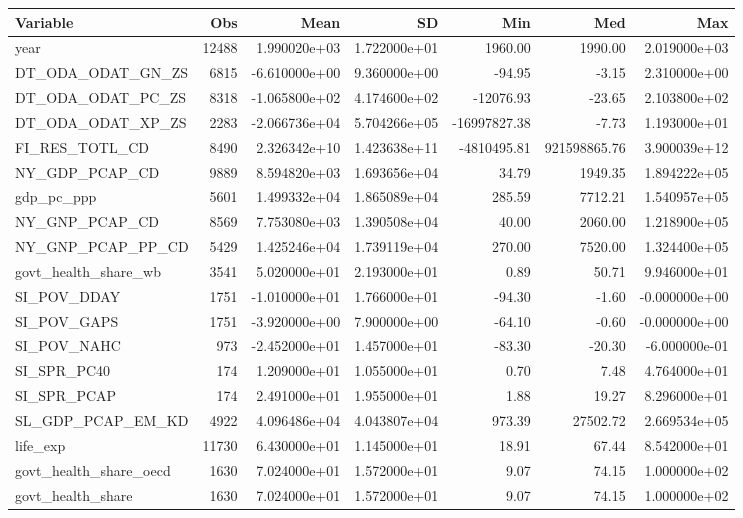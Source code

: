 \begin{tabular}{lrrrrrr}
\toprule
              Variable &   Obs &          Mean &           SD &          Min &          Med &           Max \\
\midrule
year & 12488 & 1.990020e+03 & 1.722000e+01 & 1960.00 & 1990.00 & 2.019000e+03 \\
DT\_ODA\_ODAT\_GN\_ZS & 6815 & -6.610000e+00 & 9.360000e+00 & -94.95 & -3.15 & 2.310000e+00 \\
DT\_ODA\_ODAT\_PC\_ZS & 8318 & -1.065800e+02 & 4.174600e+02 & -12076.93 & -23.65 & 2.103800e+02 \\
DT\_ODA\_ODAT\_XP\_ZS & 2283 & -2.066736e+04 & 5.704266e+05 & -16997827.38 & -7.73 & 1.193000e+01 \\
FI\_RES\_TOTL\_CD & 8490 & 2.326342e+10 & 1.423638e+11 & -4810495.81 & 921598865.76 & 3.900039e+12 \\
NY\_GDP\_PCAP\_CD & 9889 & 8.594820e+03 & 1.693656e+04 & 34.79 & 1949.35 & 1.894222e+05 \\
gdp\_pc\_ppp & 5601 & 1.499332e+04 & 1.865089e+04 & 285.59 & 7712.21 & 1.540957e+05 \\
NY\_GNP\_PCAP\_CD & 8569 & 7.753080e+03 & 1.390508e+04 & 40.00 & 2060.00 & 1.218900e+05 \\
NY\_GNP\_PCAP\_PP\_CD & 5429 & 1.425246e+04 & 1.739119e+04 & 270.00 & 7520.00 & 1.324400e+05 \\
govt\_health\_share\_wb & 3541 & 5.020000e+01 & 2.193000e+01 & 0.89 & 50.71 & 9.946000e+01 \\
SI\_POV\_DDAY & 1751 & -1.010000e+01 & 1.766000e+01 & -94.30 & -1.60 & -0.000000e+00 \\
SI\_POV\_GAPS & 1751 & -3.920000e+00 & 7.900000e+00 & -64.10 & -0.60 & -0.000000e+00 \\
SI\_POV\_NAHC & 973 & -2.452000e+01 & 1.457000e+01 & -83.30 & -20.30 & -6.000000e-01 \\
SI\_SPR\_PC40 & 174 & 1.209000e+01 & 1.055000e+01 & 0.70 & 7.48 & 4.764000e+01 \\
SI\_SPR\_PCAP & 174 & 2.491000e+01 & 1.955000e+01 & 1.88 & 19.27 & 8.296000e+01 \\
SL\_GDP\_PCAP\_EM\_KD & 4922 & 4.096486e+04 & 4.043807e+04 & 973.39 & 27502.72 & 2.669534e+05 \\
life\_exp & 11730 & 6.430000e+01 & 1.145000e+01 & 18.91 & 67.44 & 8.542000e+01 \\
govt\_health\_share\_oecd & 1630 & 7.024000e+01 & 1.572000e+01 & 9.07 & 74.15 & 1.000000e+02 \\
govt\_health\_share & 1630 & 7.024000e+01 & 1.572000e+01 & 9.07 & 74.15 & 1.000000e+02 \\
\bottomrule
\end{tabular}
